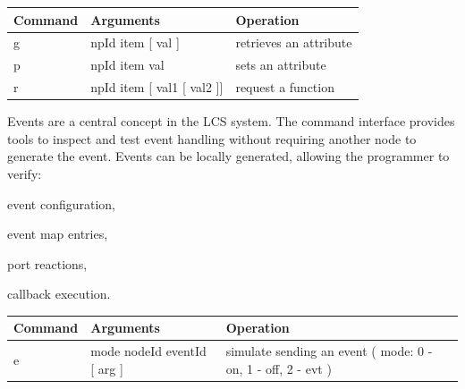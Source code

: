 \begin{table}[ht!]
    \begin{center}
        \renewcommand{\arraystretch}{1.2}
        \begin{tabularx}{0.9\textwidth}{|l|l|X|}
            \hline
            \textbf{Command} & \textbf{Arguments}  & \textbf{Operation} \\
            \hline
            g & npId item [ val ] & retrieves an attribute \\
            \hline
            p & npId item val & sets an attribute \\
            \hline
            r & npId item [ val1 [ val2 ]] & request a function \\
            \hline
        \end{tabularx}
    \end{center}
\end{table}
\FloatBarrier


Events are a central concept in the LCS system. The command interface provides tools to
inspect and test event handling without requiring another node to generate the event.
Events can be locally generated, allowing the programmer to verify:

\begin{smallGapItemize}
    \item event configuration,
    \item event map entries,
    \item port reactions,
    \item callback execution.
\end{smallGapItemize}

\begin{table}[ht!]
    \begin{center}
        \renewcommand{\arraystretch}{1.2}
        \begin{tabularx}{0.9\textwidth}{|l|l|X|}
            \hline
            \textbf{Command} & \textbf{Arguments}  & \textbf{Operation} \\
            \hline
            e & mode nodeId eventId [ arg ] & simulate sending an event ( mode: 0 - on, 1 - off, 2 - evt ) \\
            \hline
        \end{tabularx}
    \end{center}
\end{table}
\FloatBarrier



